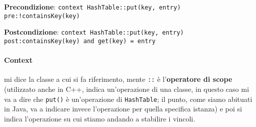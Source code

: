             \textbf{Precondizione}: \texttt{context HashTable::put(key, entry) pre:!containsKey(key)}
            
            \textbf{Postcondizione}: \texttt{context HashTable::put(key, entry) post:containsKey(key) and get(key) = entry}
            
            \vspace{1mm}
            \paragraph{Context} mi dice la classe a cui si fa riferimento, mente \texttt{::} è l'\textbf{operatore di scope} (utilizzato anche in C++, indica un'operazione di una classe, in questo caso mi va a dire che \texttt{put()} è un'operazione di \texttt{HashTable}; il punto, come siamo abituati in Java, va a indicare invece l'operazione per quella specifica istanza) e poi si indica l'operazione su cui stiamo andando a stabilire i vincoli.
            
